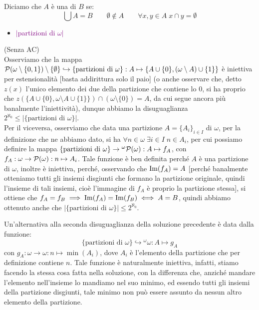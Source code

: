 \pagebreak
\begin{definition}[Partizione]
	Diciamo che $A$ è una  di $B$ se:
	\[ \bigcup A = B \qquad \emptyset \not\in A \qquad \forall x,y \in A \; x \cap y = \emptyset
		\]
\end{definition}

\begin{itemize}
	\item \textcolor{purple}{$|$partizioni di $\omega|$}
\end{itemize}

\begin{soln}
	(Senza AC)\\
	Osserviamo che la mappa $\mathcal{P}(\omega\setminus\{0,1\})\setminus\{\emptyset\} \hookrightarrow \{\text{partizioni di $\omega$}\} : A \mapsto \{A\cup \{0\},(\omega\setminus A)\cup \{1\}\}$ è iniettiva per estensionalità [basta addirittura solo il paio] (o anche osservare che, detto $z(x)$ l'unico elemento dei due della partizione che contiene lo 0, si ha proprio che $z(\{A\cup \{0\},\omega\setminus A\cup \{1\}\}) \cap (\omega\setminus\{0\}) = A$, da cui segue ancora più banalmente l'iniettività),
	dunque abbiamo la disuguaglianza $2^{\aleph_0} \leq |\{\text{partizioni di $\omega$}\}|$.\\
	Per il viceversa, osserviamo che data una partizione $A = \{A_i\}_{i \in I}$ di $\omega$, per la definizione che ne abbiamo dato, si ha $\forall n \in \omega \; \exists i \in I \; n \in A_i$, per cui possiamo definire la mappa $\{\text{partizioni di $\omega$}\} \rightarrow {}^{\omega}\mathcal{P}(\omega) : A \mapsto f_A$,
	con $f_A : \omega \rightarrow \mathcal{P}(\omega) : n \mapsto A_i$. Tale funzione è ben definita perché $A$ è una partizione di $\omega$, inoltre è iniettiva, perché, osservando che $\operatorname{Im}(f_A) = A$ [perché banalmente otteniamo tutti gli insiemi disgiunti che formano la partizione originale, quindi l'insieme di tali insiemi, cioè l'immagine di $f_A$ è proprio la partizione stessa],
	si ottiene che $f_A = f_B \implies \operatorname{Im}(f_A) = \operatorname{Im}(f_B) \iff A = B$, quindi abbiamo ottenuto anche che $|\{\text{partizioni di $\omega$}\}| \leq 2^{\aleph_0}$.
\end{soln}

\begin{remark}
	Un'alternativa alla seconda disuguaglianza della soluzione precedente è data dalla funzione:
	\[ \{\text{partizioni di $\omega$}\} \hookrightarrow {}^\omega\omega : A \mapsto g_A
		\]
	con $g_A : \omega \to \omega : n \mapsto \min(A_i)$, dove $A_i$ è l'elemento della partizione che per definizione contiene $n$. Tale funzione è naturalmente iniettiva, infatti, stiamo facendo la stessa cosa fatta nella soluzione, con la differenza che, anziché mandare l'elemento nell'insieme lo mandiamo nel suo minimo, ed essendo tutti gli insiemi della partizione disgiunti, tale minimo non può essere assunto da nessun altro elemento della partizione.
\end{remark}


